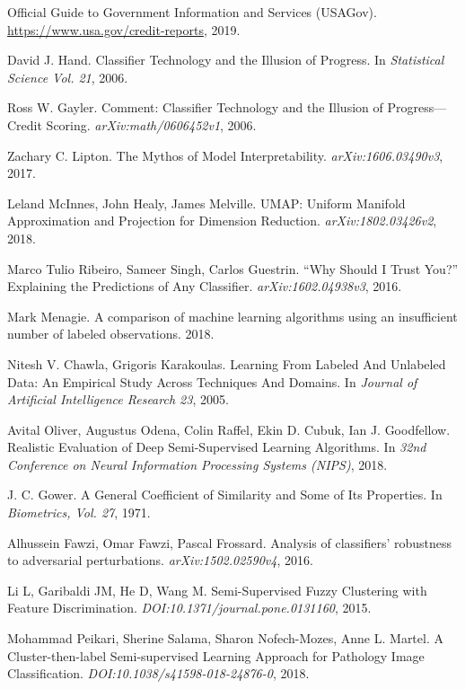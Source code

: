 \documentclass{article}
\begin{document}
\begin{thebibliography}{99}
Official Guide to Government Information and Services (USAGov).
\url{https://www.usa.gov/credit-reports}, 2019.


David J. Hand.
Classifier Technology and the Illusion of Progress.
In {\em Statistical Science Vol. 21}, 2006.

Ross W. Gayler.
Comment: Classifier Technology and the Illusion of Progress—Credit Scoring.
{\em arXiv:math/0606452v1}, 2006.

Zachary C. Lipton.
The Mythos of Model Interpretability.
{\em arXiv:1606.03490v3}, 2017.

Leland McInnes, John Healy, James Melville.
UMAP: Uniform Manifold Approximation and Projection for Dimension Reduction.
{\em arXiv:1802.03426v2}, 2018.

Marco Tulio Ribeiro, Sameer Singh, Carlos Guestrin.
“Why Should I Trust You?” Explaining the Predictions of Any Classifier.
{\em arXiv:1602.04938v3}, 2016.


Mark Menagie.
A comparison of machine learning algorithms using an insufficient number of labeled observations.
2018.

Nitesh V. Chawla, Grigoris Karakoulas.
Learning From Labeled And Unlabeled Data: An Empirical Study Across Techniques And Domains.
In {\em Journal of Artificial Intelligence Research 23}, 2005.

Avital Oliver, Augustus Odena, Colin Raffel, Ekin D. Cubuk, Ian J. Goodfellow.
Realistic Evaluation of Deep Semi-Supervised Learning Algorithms.
In {\em 32nd Conference on Neural Information Processing Systems (NIPS)}, 2018.

J. C. Gower.
A General Coefficient of Similarity and Some of Its Properties.
In {\em Biometrics, Vol. 27}, 1971.

Alhussein Fawzi, Omar Fawzi, Pascal Frossard.
Analysis of classifiers’ robustness to adversarial perturbations.
{\em arXiv:1502.02590v4}, 2016.

Li L, Garibaldi JM, He D, Wang M.
Semi-Supervised Fuzzy Clustering with Feature Discrimination. 
{\em DOI:10.1371/journal.pone.0131160}, 2015.

Mohammad Peikari, Sherine Salama, Sharon Nofech-Mozes, Anne L. Martel.
A Cluster-then-label Semi-supervised Learning Approach for Pathology Image Classification.
{\em DOI:10.1038/s41598-018-24876-0}, 2018.


\end{thebibliography}
\end{document}
